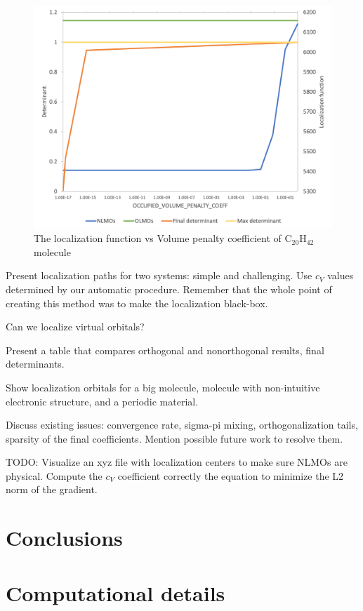 \documentclass[aps,prl,reprint,amsmath,amssymb]{revtex4-1}
\begin{document}
\begin{figure}[htbp]
\includegraphics[scale=0.5]{C20H42.png} 
  \caption{The localization function vs Volume penalty coefficient of C$_{20}$H$_{42}$ molecule}
\end{figure}

Present localization paths for two systems: simple and challenging. Use $c_V$ values determined by our automatic procedure. Remember that the whole point of creating this method was to make the localization black-box.

Can we localize virtual orbitals?

Present a table that compares orthogonal and nonorthogonal results, final determinants.

Show localization orbitals for a big molecule, molecule with non-intuitive electronic structure, and a periodic material.

Discuss existing issues: convergence rate, sigma-pi mixing, orthogonalization tails, sparsity of the final coefficients. Mention possible future work to resolve them.

TODO: Visualize an xyz file with localization centers to make sure NLMOs are physical. Compute the $c_V$ coefficient correctly the equation to minimize the L2 norm of the gradient.

\section{Conclusions}


\section{Computational details}
\end{document}
